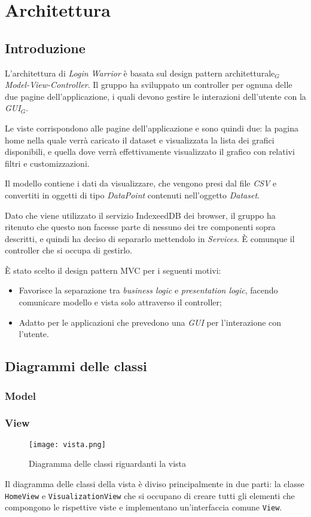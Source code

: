 \chapter{Architettura}
\section{Introduzione}
L'architettura di \textit{Login Warrior} è basata sul design pattern architetturale$_G$ \textit{Model-View-Controller}. Il gruppo ha sviluppato un controller per ognuna delle due pagine dell'applicazione, i quali devono gestire le interazioni dell'utente con la \textit{GUI}$_G$.

 Le viste corrispondono alle pagine dell'applicazione e sono quindi due: la pagina home nella quale verrà caricato il dataset e visualizzata la lista dei grafici disponibili, e quella dove verrà effettivamente visualizzato il grafico con relativi filtri e customizzazioni.

 Il modello contiene i dati da visualizzare, che vengono presi dal file \textit{CSV} e convertiti in oggetti di tipo \textit{DataPoint} contenuti nell'oggetto \textit{Dataset}.

 Dato che viene utilizzato il servizio IndexeedDB dei browser, il gruppo ha ritenuto che questo non facesse parte di nessuno dei tre componenti sopra descritti, e quindi ha deciso di separarlo mettendolo in \textit{Services}. È comunque il controller che si occupa di gestirlo.


È stato scelto il design pattern MVC per i seguenti motivi:
\begin{itemize}
  \item Favorisce la separazione tra \textit{business logic} e \textit{presentation logic}, facendo comunicare modello e vista solo attraverso il controller;
  \item Adatto per le applicazioni che prevedono una \textit{GUI} per l'interazione con l'utente.
\end{itemize}
\section{Diagrammi delle classi}
\subsection{Model}
\subsection{View}
\begin{figure}[H]
    \texttt{[image: vista.png]}
    \caption{Diagramma delle classi riguardanti la vista}
\end{figure}
Il diagramma delle classi della vista è diviso principalmente in due parti: la classe \texttt{HomeView} e \texttt{VisualizationView} che si occupano di creare tutti gli elementi che compongono le rispettive viste e implementano un'interfaccia comune \texttt{View}.


